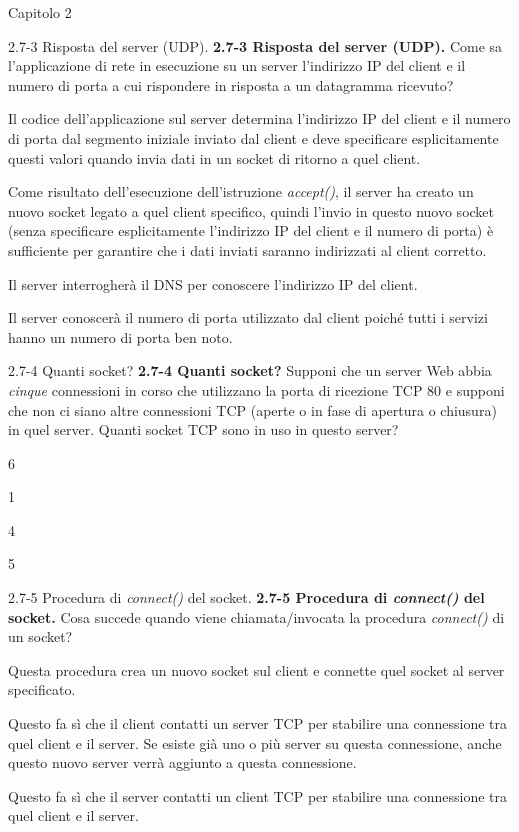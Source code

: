 \documentclass[a4paper]{article}
\begin{document}
\begin{quiz}{Capitolo 2}
\begin{multi}[points=1,shuffle]{2.7-3 Risposta del server (UDP).}
\textbf{2.7-3 Risposta del server (UDP).}
Come sa l'applicazione di rete in esecuzione su un server l'indirizzo IP del client e il numero di porta a cui rispondere in risposta a un datagramma ricevuto?
\item* Il codice dell'applicazione sul server determina l'indirizzo IP del client e il numero di porta dal segmento iniziale inviato dal client e deve specificare esplicitamente questi valori quando invia dati in un socket di ritorno a quel client.
\item Come risultato dell'esecuzione dell'istruzione \emph{accept()}, il server ha creato un nuovo socket legato a quel client specifico, quindi l'invio in questo nuovo socket (senza specificare esplicitamente l'indirizzo IP del client e il numero di porta) è sufficiente per garantire che i dati inviati saranno indirizzati al client corretto.
\item Il server interrogherà il DNS per conoscere l'indirizzo IP del client.
\item Il server conoscerà il numero di porta utilizzato dal client poiché tutti i servizi hanno un numero di porta ben noto.
\end{multi}

\begin{multi}[points=1,shuffle]{2.7-4 Quanti socket?}
\textbf{2.7-4 Quanti socket?}
Supponi che un server Web abbia \emph{cinque} connessioni in corso che utilizzano la porta di ricezione TCP 80 e supponi che non ci siano altre connessioni TCP (aperte o in fase di apertura o chiusura) in quel server. Quanti socket TCP sono in uso in questo server?
\item* 6
\item 1
\item 4
\item 5
\end{multi}

\begin{multi}[points=1,shuffle]{2.7-5 Procedura di \emph{connect()} del socket.}
\textbf{2.7-5 Procedura di \emph{connect()} del socket.}
Cosa succede quando viene chiamata/invocata la procedura \emph{connect()} di un socket?
\item* Questa procedura crea un nuovo socket sul client e connette quel socket al server specificato.
\item Questo fa sì che il client contatti un server TCP per stabilire una connessione tra quel client e il server. Se esiste già uno o più server su questa connessione, anche questo nuovo server verrà aggiunto a questa connessione.
\item Questo fa sì che il server contatti un client TCP per stabilire una connessione tra quel client e il server.
\end{multi}
                              
\end{quiz}
\end{document}
